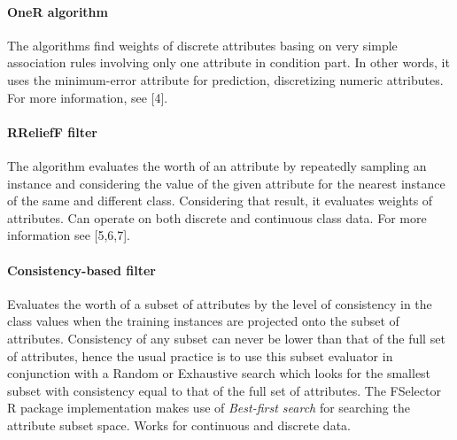 \documentclass[10pt]{article}\usepackage[]{graphicx}\usepackage[]{color}
\begin{document}
\paragraph{OneR algorithm}
The algorithms find weights of discrete attributes basing on very simple association rules involving only one attribute in condition part. In other words, it uses the minimum-error attribute for prediction, discretizing numeric attributes. For more information, see [4]. 

\paragraph{RReliefF filter}
The algorithm evaluates the worth of an attribute by repeatedly sampling an instance and considering the value of the given attribute for the nearest instance of the same and different class. Considering that result, it evaluates weights of attributes. Can operate on both discrete and continuous class data. For more information see [5,6,7]. 

\paragraph{Consistency-based filter}
Evaluates the worth of a subset of attributes by the level of consistency in the class values when the training instances are projected onto the subset of attributes. Consistency of any subset can never be lower than that of the full set of attributes, hence the usual practice is to use this subset evaluator in conjunction with a Random or Exhaustive search which looks for the smallest subset with consistency equal to that of the full set of attributes. The FSelector R package implementation makes use of \textit{Best-first search} for searching the attribute subset space. Works for continuous and discrete data.
\end{document}
